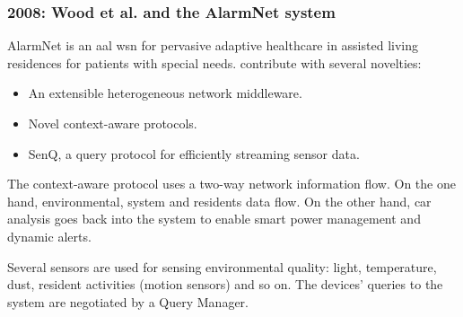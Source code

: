 \subsubsection{2008: Wood et al. and the AlarmNet system}
\label{sec:wood}

AlarmNet is an \ac{aal} \ac{wsn} for pervasive adaptive healthcare in assisted 
living residences for patients with special needs. \citet{wood_context_aware_2008} 
contribute with several novelties:

\begin{itemize}
  \item An extensible heterogeneous network middleware.
  \item Novel context-aware protocols.
  \item SenQ, a query protocol for efficiently streaming sensor data.
\end{itemize}

The context-aware protocol uses a two-way network information flow. On the one 
hand, environmental, system and residents data flow. On the other hand, \ac{car} 
analysis goes back into the system to enable smart power management and dynamic 
alerts.

Several sensors are used for sensing environmental quality: light, temperature,
dust, resident activities (motion sensors) and so on. The devices' queries to the 
system are negotiated by a Query Manager.